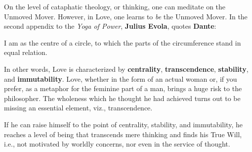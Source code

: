 On the level of cataphatic theology, or thinking, one can meditate on the Unmoved Mover. However, in Love, one learns to
\emph{be} the Unmoved Mover. In the second appendix to the \emph{Yoga of Power}, \textbf{Julius Evola}, quotes
\textbf{Dante}:

\begin{quotex}
I am as the centre of a circle, to which the parts of the circumference stand in equal relation. 

\end{quotex}
In other words, Love is characterized by \textbf{centrality}, \textbf{transcendence}, \textbf{stability}, and
\textbf{immutability}. Love, whether in the form of an actual woman or, if you prefer, as a metaphor for the feminine
part of a man, brings a huge risk to the philosopher. The wholeness which he thought he had achieved turns out to be
missing an essential element, viz., transcendence.

If he can raise himself to the point of centrality, stability, and immutability, he reaches a level of being that
transcends mere thinking and finds his True Will, i.e., not motivated by worldly concerns, nor even in the service of
thought.


